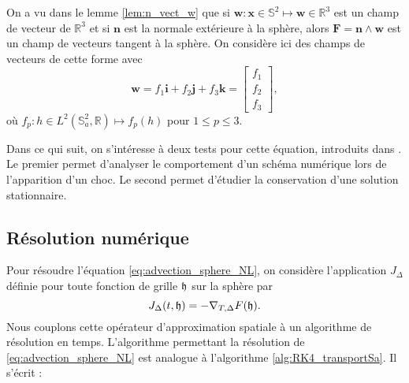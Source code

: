 On a vu dans le lemme \ref{lem:n_vect_w} que si $\mathbf{w} : \mathbf{x} \in \mathbb{S}^2 \mapsto \mathbf{w} \in \mathbb{R}^3$ est un champ de vecteur de $\mathbb{R}^3$ et si $\mathbf{n}$ est la normale extérieure à la sphère, alors $\mathbf{F} = \mathbf{n} \wedge \mathbf{w}$ est un champ de vecteurs tangent à la sphère. On considère ici des champs de vecteurs de cette forme avec 
\begin{equation}
\mathbf{w} = f_1 \mathbf{i} + f_2 \mathbf{j}+ f_3 \mathbf{k} = \begin{bmatrix}
f_1 \\ f_2 \\ f_3
\end{bmatrix},
\end{equation}
où $f_p : h \in L^2(\mathbb{S}_a^2, \mathbb{R}) \mapsto f_p(h)$  pour $1 \leq p \leq 3$.


Dans ce qui suit, on s'intéresse à deux tests pour cette équation, introduits dans \cite{BenArtzi2009}. Le premier permet d'analyser le comportement d'un schéma numérique lors de l'apparition d'un choc. Le second permet d'étudier la conservation d'une solution stationnaire.










\subsection{Résolution numérique}

Pour résoudre l'équation \eqref{eq:advection_sphere_NL}, on considère l'application $J_{\Delta}$ définie pour toute fonction de grille $\mathfrak{h}$ sur la sphère par
\begin{equation}
J_{\Delta}(t,\mathfrak{h}) = - \nabla_{T,\Delta} F(\mathfrak{h}).
\end{equation}
Nous couplons cette opérateur d'approximation spatiale à un algorithme de résolution en temps. L'algorithme permettant la résolution de \eqref{eq:advection_sphere_NL} est analogue à l'algorithme \ref{alg:RK4_transportSa}. Il s'écrit :

